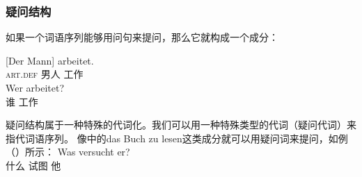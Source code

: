 \subsubsection{疑问结构}
如果一个词语序列能够用问句来提问，那么它就构成一个成分：

\eal
\ex 
\gll {}[Der Mann] arbeitet.\\
	 \spacebr{}\textsc{art}.\textsc{def} 男人 工作\\
\ex 
\gll Wer arbeitet?\\
	 谁 工作\\
\zl

\noindent
疑问结构属于一种特殊的代词化。我们可以用一种特殊类型的代词（疑问代词）来指代词语序列。
像中的das Buch zu lesen这类成分就可以用疑问词来提问，如例（）所示：
\ea
\gll Was versucht er?\\
     什么 试图 他\\
\z


